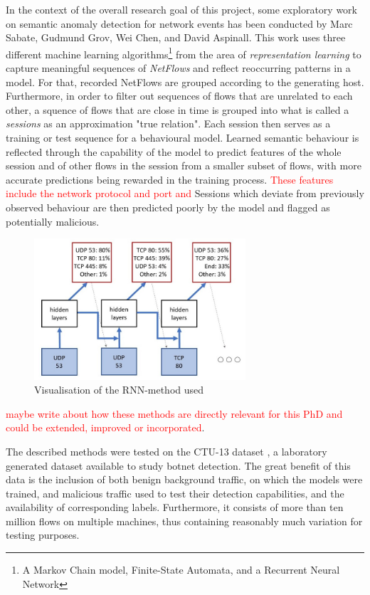 \documentclass[a4paper,12pt,twoside]{report}
\begin{document}
In the context of the overall research goal of this project, some exploratory work on semantic anomaly detection for network events has been conducted by Marc Sabate, Gudmund Grov, Wei Chen, and David Aspinall. This work uses three different machine learning algorithms\footnote{A Markov Chain model, Finite-State Automata, and a Recurrent Neural Network} from the area of \textit{representation learning} to capture meaningful sequences of \textit{NetFlows} and reflect reoccurring patterns in a model. For that, recorded NetFlows are grouped according to the generating host. Furthermore, in order to filter out sequences of flows that are unrelated to each other, a squence of flows that are close in time is grouped into what is called a \textit{sessions} as an approximation "true relation". Each session then serves as a training or test sequence for a behavioural model. Learned semantic behaviour is reflected through the capability of the model to predict features of the whole session and of other flows in the session from a smaller subset of flows, with more accurate predictions being rewarded in the training process. \textcolor{red}{These features include the network protocol and port and} Sessions which deviate from previously observed behaviour are then predicted poorly by the model and flagged as potentially malicious.

\begin{figure}\label{RNN}
\centering
\includegraphics[width=0.7\textwidth]{images/RNN.jpg}
\caption{Visualisation of the RNN-method used}
\end{figure}

\textcolor{red}{maybe write about how these methods are directly relevant for this PhD and could be extended, improved or incorporated}.

The described methods were tested on the CTU-13 dataset \cite{garcia2014empirical}, a laboratory generated dataset available to study botnet detection. The great benefit of this data is the inclusion of both benign background traffic, on which the models were trained, and malicious traffic used to test their detection capabilities, and the availability of corresponding labels. Furthermore, it consists of more than ten million flows on multiple machines, thus containing reasonably much variation for testing purposes.
\end{document}
